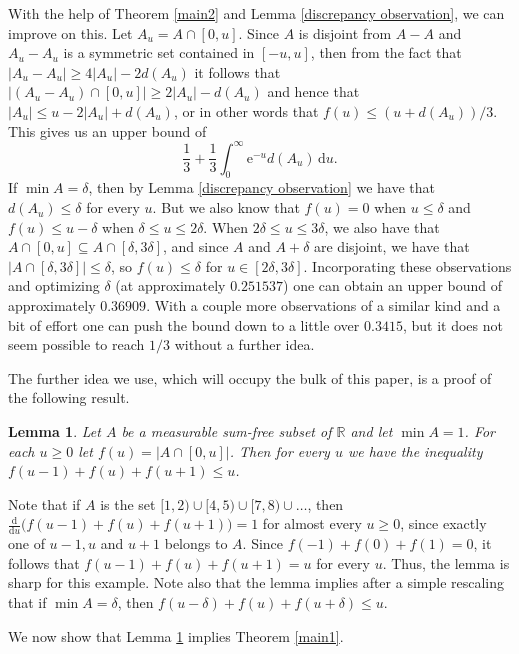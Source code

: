 \documentclass[11pt,reqno]{amsart}
\newtheorem{lemma}[theorem]{Lemma}
\theoremstyle{definition}
\def\R{\mathbb{R}}
\def\d{\delta}
\def\F#1{f(#1)}
\def\subset{\subseteq}
\begin{document}
With the help of Theorem \ref{main2} and Lemma \ref{discrepancy observation}, we can improve on this. Let $A_u=A\cap[0,u]$. Since $A$ is disjoint from $A-A$ and $A_u-A_u$ is a symmetric set contained in $[-u,u]$, then from the fact that $|A_u-A_u|\geq 4|A_u|-2d(A_u)$ it follows that $|(A_u-A_u)\cap[0,u]|\geq 2|A_u|-d(A_u)$ and hence that $|A_u|\leq u-2|A_u|+d(A_u)$, or in other words that $\F{u}\leq(u+d(A_u))/3$. This gives us an upper bound of
\[\frac 13+\frac 13\int_0^\infty\mathrm e^{-u}d(A_u)\,\mathrm du.\]
If $\min A=\d$, then by Lemma \ref{discrepancy observation} we have that $d(A_u)\leq\d$ for every $u$. But we also know that $\F{u}=0$ when $u\leq\d$ and $\F{u}\leq u-\d$ when $\d\leq u\leq 2\d$. When $2\d\leq u\leq 3\d$, we also have that $A\cap[0,u]\subset A\cap[\d,3\d]$, and since $A$ and $A+\d$ are disjoint, we have that $|A\cap[\d,3\d]|\leq\d$, so $\F{u}\leq\d$ for $u\in[2\d,3\d]$. Incorporating these observations and optimizing $\d$ (at approximately $0.251537$) one can obtain an upper bound of approximately $0.36909$. With a couple more observations of a similar kind and a bit of effort one can push the bound down to a little over $0.3415$, but it does not seem possible to reach $1/3$ without a further idea.

The further idea we use, which will occupy the bulk of this paper, is a proof of the following result.

\begin{lemma} \label{key lemma} Let $A$ be a measurable sum-free subset of $\R$ and let $\min A = 1$. For each $u\geq 0$ let $\F{u}=|A\cap[0,u]|$. Then for every $u$ we have the inequality $\F{u-1}+\F{u}+\F{u+1}\leq u$. 
\end{lemma}

Note that if $A$ is the set $[1,2)\cup[4,5)\cup[7,8)\cup\dots$, then $\frac{\mathrm d}{\mathrm du}\big(\F{u-1}+\F{u}+\F{u+1}\big)=1$ for almost every $u\geq 0$, since exactly one of $u-1,u$ and $u+1$ belongs to $A$. Since $\F{-1}+\F{0}+\F{1}=0$, it follows that $\F{u-1}+\F{u}+\F{u+1}=u$ for every $u$. Thus, the lemma is sharp for this example. Note also that the lemma implies after a simple rescaling that if $\min A=\d$, then $\F{u-\d}+\F{u}+\F{u+\d}\leq u$. 

We now show that Lemma \ref{key lemma} implies Theorem \ref{main1}. 
\end{document}
